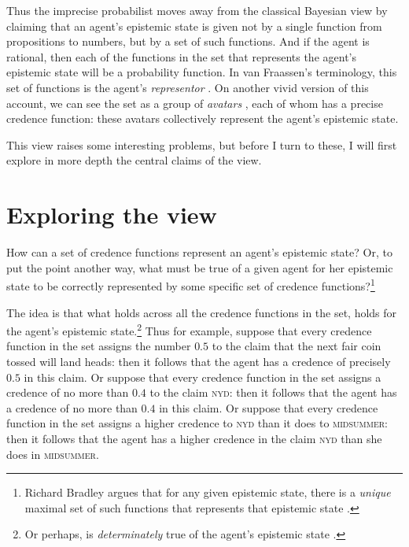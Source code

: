 Thus the imprecise probabilist moves away from the classical Bayesian view by claiming that an agent's epistemic state is given not by a single function from propositions to numbers, but by a set of such functions. And if the agent is rational, then each of the functions in the set that represents the agent's epistemic state will be a probability function. In van Fraassen's terminology, this set of functions is the agent's \textit{representor} \citep{vanfraassen1990}. On another vivid version of this account, we can see the set as a group of \textit{avatars} \citep{bradley2009}, each of whom has a precise credence function: these avatars collectively represent the agent's epistemic state.
 
This view raises some interesting problems, but before I turn to these, I will first explore in more depth the central claims of the view.


\section{Exploring the view}

How can a set of credence functions represent an agent's epistemic state? Or, to put the point another way, what must be true of a given agent for her epistemic state to be correctly represented by some specific set of credence functions?\footnote{Richard Bradley argues that for any given epistemic state, there is a \emph{unique} maximal set of such functions that represents that epistemic state \citep[242]{bradley2009}.}  

The idea is that what holds across all the credence functions in the set, holds for the agent's epistemic state.\footnote{Or perhaps, is \emph{determinately} true of the agent's epistemic state \citep{rinard2015}.} Thus for example, suppose that every credence function in the set assigns the number $0.5$ to the claim that the next fair coin tossed will land heads: then it follows that the agent has a credence of precisely $0.5$ in this claim. Or suppose that every credence function in the set assigns a credence of no more than $0.4$ to the claim \textsc{nyd}: then it follows that the agent has a credence of no more than $0.4$ in this claim. Or suppose that every credence function in the set assigns a higher credence to \textsc{nyd} than it does to \textsc{midsummer}: then it follows that the agent has a higher credence in the claim \textsc{nyd} than she does in \textsc{midsummer}. 


